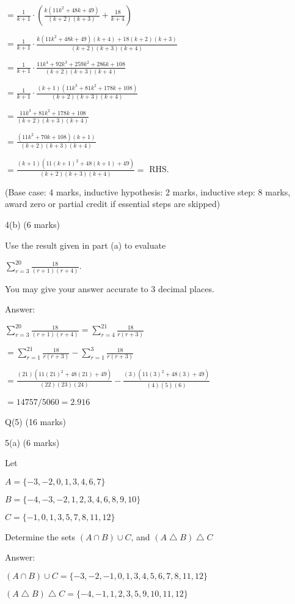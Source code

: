 \documentclass[a4paper,12pt,oneside]{book}
\theoremstyle{definition}
\begin{document}
$= \frac{1}{k+1} \cdot \left( \frac{k(11k^2 + 48k + 49)}{(k+2)(k+3)} + \frac{18}{k+4}  \right)$

$= \frac{1}{k+1} \cdot \frac{k(11k^2 + 48k + 49)(k+4) + 18(k+2)(k+3)}{(k+2)(k+3)(k+4)}$

$= \frac{1}{k+1} \cdot \frac{11 k^4 + 92 k^3 + 259 k^2 + 286 k + 108}{(k+2)(k+3)(k+4)}$

$= \frac{1}{k+1} \cdot \frac{(k + 1) (11 k^3 + 81 k^2 + 178 k + 108)}{(k+2)(k+3)(k+4)}$

$= \frac{11 k^3 + 81 k^2 + 178 k + 108}{(k+2)(k+3)(k+4)}$

$= \frac{(11 k^2 + 70 k + 108)(k + 1)}{(k+2)(k+3)(k+4)}$

$= \frac{(k + 1)(11(k+1)^2 + 48(k+1) + 49)}{(k+2)(k+3)(k+4)} = $ RHS.

(Base case: 4 marks, inductive hypothesis: 2 marks, inductive step: 8 marks, award zero or partial credit if essential steps are skipped)

4(b) (6 marks) 

Use the result given in part (a) to evaluate

$\sum_{r=3}^{20} \frac{18}{(r+1)(r+4)}$.

You may give your answer accurate to 3 decimal places.

Answer:

$\sum_{r=3}^{20} \frac{18}{(r+1)(r+4)} = \sum_{r=4}^{21} \frac{18}{r(r+3)}$

$= \sum_{r=1}^{21} \frac{18}{r(r+3)} - \sum_{r=1}^{3} \frac{18}{r(r+3)}$

$= \frac{(21)(11(21)^2 + 48(21) + 49)}{(22)(23)(24)} - \frac{(3)(11(3)^2 + 48(3) + 49)}{(4)(5)(6)} $

$=  14757/5060 = 2.916$ 

\newpage
 
Q(5) (16 marks)

5(a) (6 marks)

Let 

$A = \{ -3, -2, 0, 1, 3, 4, 6, 7 \}$ 

$B = \{ -4, -3, -2, 1, 2, 3, 4, 6, 8, 9, 10 \}$

$C = \{ -1, 0, 1, 3, 5, 7, 8, 11, 12 \}$

Determine the sets $(A \cap B) \cup C$, and $(A \bigtriangleup B) \bigtriangleup C$

Answer:

$(A \cap B) \cup C = \{ -3, -2, -1, 0, 1, 3, 4, 5, 6, 7, 8, 11, 12 \}$

$(A \bigtriangleup B) \bigtriangleup C = \{ -4, -1, 1, 2, 3, 5, 9, 10, 11, 12 \}$
\end{document}
